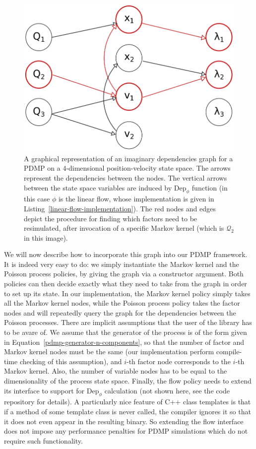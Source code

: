 \documentclass[report.tex]{subfiles}
\begin{document}
\begin{figure}
  \centering
  \includegraphics[width=.5\textwidth]{img/ch3-dependencies-graph}
  \caption{A graphical representation of an imaginary dependencies graph for
           a PDMP on a $4$-dimensional position-velocity state space.
           The arrows represent the dependencies between the nodes.
           The vertical arrows between the state space variables are
           induced by $\text{Dep}_{\phi}$ function (in this case
           $\phi$ is the linear flow, whose implementation is given in
           Listing~\ref{linear-flow-implementation}).
           The red nodes and edges depict the procedure
           for finding which factors need to be resimulated, after invocation
           of a specific Markov kernel (which is $\mathcal{Q}_{2}$ in this image).}
  \label{image-dependencies-graph}
\end{figure}

We will now describe how to incorporate this graph into our PDMP framework.
It is indeed very easy to do: we simply instantiate the Markov kernel and the Poisson process
policies, by giving the graph via a constructor argument.
Both policies can then decide exactly what they need to take from the graph in order
to set up its state. In our implementation, the Markov kernel policy simply
takes all the Markov kernel nodes, while the Poisson process policy takes the
factor nodes and will repeatedly query the graph for the dependencies between
the Poisson processes. There are implicit assumptions that the user of the
library has to be avare of. We assume that the generator of the process is
of the form given in Equation~\ref{pdmp-generator-n-components}, so that the
number of factor and Markov kernel nodes must be the same (our implementation
perform compile-time checking of this assumption), and $i$-th factor
node corresponds to the $i$-th Markov kernel. Also, the number
of variable nodes has to be equal to the dimensionality of the process
state space.
Finally, the flow policy needs to extend its interface
to support for $\text{Dep}_{\phi}$ calculation (not shown here, see the code
repository for details). A particularly nice feature of C++ class templates
is that if a method of some template class is never called, the compiler ignores it
so that it does not even appear in the resulting binary.
So extending the flow interface does not impose any performance penalties
for PDMP simulations which do not require such functionality.
\end{document}
